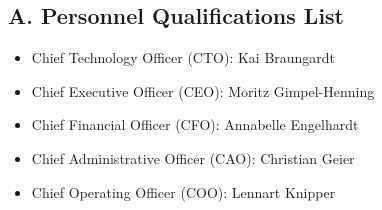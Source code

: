 \subsection{A. Personnel Qualifications List}
\begin{itemize}
\item Chief Technology Officer (CTO): 		Kai Braungardt
\item Chief Executive Officer (CEO): 		Moritz Gimpel-Henning
\item Chief Financial Officer (CFO): 		Annabelle Engelhardt
\item Chief Administrative Officer (CAO): 	Christian Geier
\item Chief Operating Officer (COO): 		Lennart Knipper
\end{itemize}






